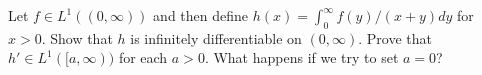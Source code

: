 Let $f\in L^1((0,\infty))$ and then define
$h(x)=\int_0^{\infty}f(y)/(x+y)dy$ for $x>0$. Show that $h$ is
infinitely differentiable on $(0,\infty)$. Prove that $h'\in
L^1([a,\infty))$ for each $a>0$. What happens if we try to set $a=0$?
